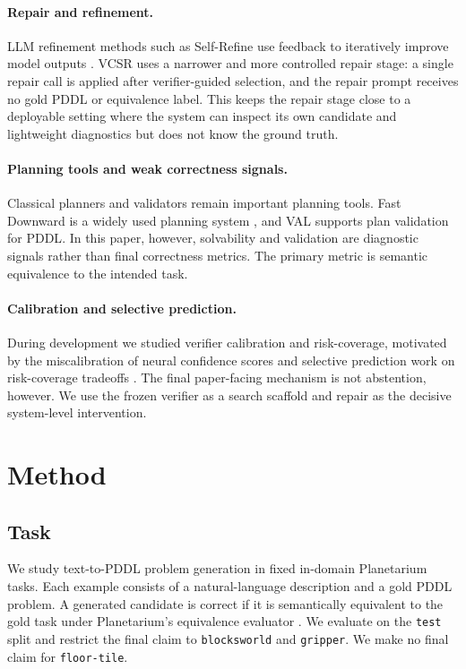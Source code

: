 \documentclass[11pt]{article}
\newcommand{\vcsr}{\textsc{VCSR}\xspace}
\newcommand{\pddl}{\textsc{PDDL}\xspace}
\begin{document}
\paragraph{Repair and refinement.}
LLM refinement methods such as Self-Refine use feedback to iteratively improve
model outputs \citep{madaan2023selfrefine}. \vcsr uses a narrower and more
controlled repair stage: a single repair call is applied after verifier-guided
selection, and the repair prompt receives no gold \pddl or equivalence label.
This keeps the repair stage close to a deployable setting where the system can
inspect its own candidate and lightweight diagnostics but does not know the
ground truth.

\paragraph{Planning tools and weak correctness signals.}
Classical planners and validators remain important planning tools. Fast
Downward is a widely used planning system \citep{helmert2006fastdownward}, and
VAL supports plan validation for \pddl \citep{howey2004val}. In this paper,
however, solvability and validation are diagnostic signals rather than final
correctness metrics. The primary metric is semantic equivalence to the intended
task.

\paragraph{Calibration and selective prediction.}
During development we studied verifier calibration and risk-coverage, motivated
by the miscalibration of neural confidence scores \citep{guo2017calibration}
and selective prediction work on risk-coverage tradeoffs
\citep{geifman2017selective}. The final paper-facing mechanism is not
abstention, however. We use the frozen verifier as a search scaffold and repair
as the decisive system-level intervention.

\section{Method}

\subsection{Task}

We study text-to-\pddl problem generation in fixed in-domain Planetarium tasks.
Each example consists of a natural-language description and a gold \pddl
problem. A generated candidate is correct if it is semantically equivalent to
the gold task under Planetarium's equivalence evaluator
\citep{zuo2024planetarium,planetarium_dataset,planetarium_code}. We evaluate on
the \texttt{test} split and restrict the final claim to \texttt{blocksworld} and
\texttt{gripper}. We make no final claim for \texttt{floor-tile}.
\end{document}
